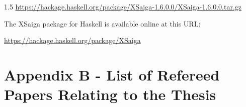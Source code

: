 \documentclass[fleqn, oneside, 12pt]{book}
\theoremstyle{definitionsty}
\newcommand{\uwinonehalfspacelen}{1.5}
\newcommand{\uwindefaultspacelen}{\uwinonehalfspacelen}
\newenvironment{uwindefaultspaceenv}%
{\begin{spacing}{\uwindefaultspacelen}}%
	{\end{spacing}}
\begin{document}
\begin{uwindefaultspaceenv}
{\noindent \small \url{https://hackage.haskell.org/package/XSaiga-1.6.0.0/XSaiga-1.6.0.0.tar.gz}}

\noindent The XSaiga package for Haskell is available online at this URL:

{\noindent \small \url{https://hackage.haskell.org/package/XSaiga}}

%
%
%
%
%
%


\section*{Appendix B - List of Refereed Papers Relating to the Thesis}
\label{appendix:b}


\end{uwindefaultspaceenv}
\end{document}
